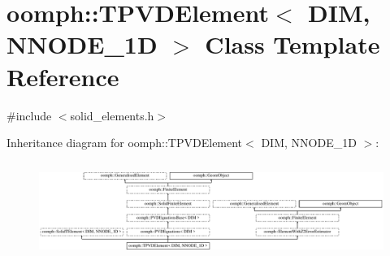\hypertarget{classoomph_1_1TPVDElement}{}\section{oomph\+:\+:T\+P\+V\+D\+Element$<$ D\+IM, N\+N\+O\+D\+E\+\_\+1D $>$ Class Template Reference}
\label{classoomph_1_1TPVDElement}


{\ttfamily \#include $<$solid\+\_\+elements.\+h$>$}

Inheritance diagram for oomph\+:\+:T\+P\+V\+D\+Element$<$ D\+IM, N\+N\+O\+D\+E\+\_\+1D $>$\+:\begin{figure}[H]
\begin{center}
\leavevmode
\includegraphics[height=3.157895cm]{classoomph_1_1TPVDElement}
\end{center}
\end{figure}
